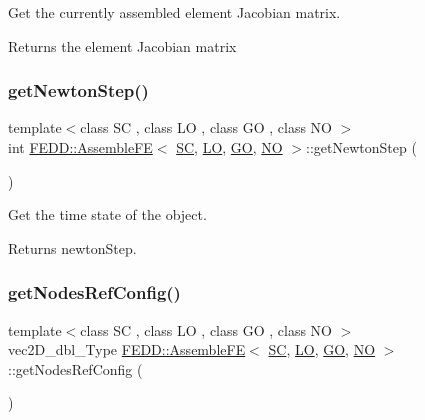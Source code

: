 Get the currently assembled element Jacobian matrix. 

\begin{DoxyReturn}{Returns}
the element Jacobian matrix 
\end{DoxyReturn}
\mbox{\label{classFEDD_1_1AssembleFE_af11bbb371048522d35ecb1f4f2584a8a}} 
\subsubsection{\texorpdfstring{get\+Newton\+Step()}{getNewtonStep()}}
{\footnotesize\ttfamily template$<$class SC , class LO , class GO , class NO $>$ \\
int \hyperlink{classFEDD_1_1AssembleFE}{F\+E\+D\+D\+::\+Assemble\+FE}$<$ \hyperlink{fe__test__laplace_8cpp_a79c7e86a57edbb2a5a53242bcd04e41e}{SC}, \hyperlink{fe__test__laplace_8cpp_ad6a38c9f07d3fd633eefca5bccad8410}{LO}, \hyperlink{fe__test__laplace_8cpp_afa2946b509009b4f45eb04bd8c5b27d9}{GO}, \hyperlink{fe__test__laplace_8cpp_a5e24f37b28787429872b6ecb1d0417ce}{NO} $>$\+::get\+Newton\+Step (\begin{DoxyParamCaption}{ }\end{DoxyParamCaption})}



Get the time state of the object. 

\begin{DoxyReturn}{Returns}
newton\+Step. 
\end{DoxyReturn}
\mbox{\label{classFEDD_1_1AssembleFE_a93f37b5e5f8f9a73152abb2e8be4ba4f}} 
\subsubsection{\texorpdfstring{get\+Nodes\+Ref\+Config()}{getNodesRefConfig()}}
{\footnotesize\ttfamily template$<$class SC , class LO , class GO , class NO $>$ \\
vec2\+D\+\_\+dbl\+\_\+\+Type \hyperlink{classFEDD_1_1AssembleFE}{F\+E\+D\+D\+::\+Assemble\+FE}$<$ \hyperlink{fe__test__laplace_8cpp_a79c7e86a57edbb2a5a53242bcd04e41e}{SC}, \hyperlink{fe__test__laplace_8cpp_ad6a38c9f07d3fd633eefca5bccad8410}{LO}, \hyperlink{fe__test__laplace_8cpp_afa2946b509009b4f45eb04bd8c5b27d9}{GO}, \hyperlink{fe__test__laplace_8cpp_a5e24f37b28787429872b6ecb1d0417ce}{NO} $>$\+::get\+Nodes\+Ref\+Config (\begin{DoxyParamCaption}{ }\end{DoxyParamCaption})}



